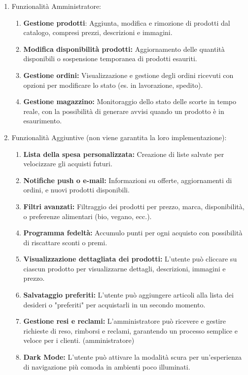 \documentclass[a4paper,12pt]{article}
\begin{document}
\begin{enumerate}
\begin{enumerate}
   \item{Funzionalità Amministratore: }
       \begin{enumerate}
       \item \textbf{Gestione prodotti}: Aggiunta, modifica e rimozione di prodotti dal catalogo, compresi prezzi, descrizioni e immagini.
       \item \textbf{Modifica disponibilità prodotti: }Aggiornamento delle quantità disponibili o sospensione temporanea di prodotti esauriti.
       \item \textbf{Gestione ordini:} Visualizzazione e gestione degli ordini ricevuti con opzioni per modificare lo stato (es. in lavorazione, spedito).
       \item \textbf{Gestione magazzino:} Monitoraggio dello stato delle scorte in tempo reale, con la possibilità di generare avvisi quando un prodotto è in esaurimento.
       \end{enumerate}
   
   \item{Funzionalità Aggiuntive (non viene garantita la loro implementazione)}: 
       \begin{enumerate}
       \item \textbf{Lista della spesa personalizzata:} Creazione di liste salvate per velocizzare gli acquisti futuri.
       \item \textbf{Notifiche push o e-mail:} Informazioni su offerte, aggiornamenti di ordini, e nuovi prodotti disponibili.
       \item \textbf{Filtri avanzati:} Filtraggio dei prodotti per prezzo, marca, disponibilità, o preferenze alimentari (bio, vegano, ecc.).
       \item \textbf{Programma fedeltà: }Accumulo punti per ogni acquisto con possibilità di riscattare sconti o premi.
       \item \textbf{Visualizzazione dettagliata dei prodotti: }L'utente può cliccare su ciascun prodotto per visualizzarne dettagli, descrizioni, immagini e prezzo.
       \item \textbf{Salvataggio preferiti:} L'utente può aggiungere articoli alla lista dei desideri o "preferiti" per acquistarli in un secondo momento.
       \item \textbf{Gestione resi e reclami:} L'amministratore può ricevere e gestire richieste di reso, rimborsi e reclami, garantendo un processo semplice e veloce per i clienti. (amministratore)
       \item \textbf{Dark Mode:} L'utente può attivare la modalità scura per un'esperienza di navigazione più comoda in ambienti poco illuminati.
       \end{enumerate}
   

\end{enumerate}
\end{enumerate}
\end{document}
